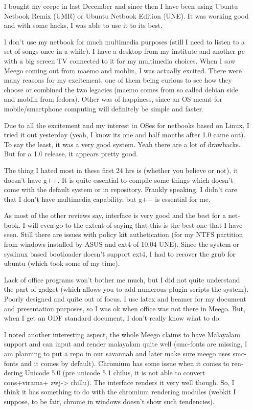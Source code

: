 \vskip 2pt
\begin{english}
I bought my eeepc in last December and since then I have been using Ubuntu Netbook Remix (UMR) or Ubuntu Netbook Edition (UNE). 
It was working good and with some hacks, I was able to use it to its best.

I don't use my netbook for much multimedia purposes (still I need to listen to a set of songs once in a while). 
I have a desktop from my institute and another pc with a big screen TV connected to it for my multimedia choices. 
When I saw Meego coming out from maemo and moblin, I was actually excited. There were many reasons for my excitement, 
one of them being curious to see how they choose or combined the two legacies (maemo comes from so called debian side and moblin from fedora).
Other was of happiness, since an OS meant for mobile/smartphone computing will definitely be simple and faster.

Due to all the excitement and my interest in OSes for netbooks based on Linux, I tried it out yesterday (yeah, I know its one and half months after 1.0 came out). To say the least, it was a very good system. 
Yeah there are a lot of drawbacks. But for a 1.0 release, it appears pretty good.

The thing I hated most in these first 24 hrs is (whether you believe or not), it doesn’t have g++. 
It is quite essential to compile some things which doesn’t come with the default system or in repository. 
Frankly speaking, I didn’t care that I don’t have multimedia capability, but g++ is essential for me.

As most of the other reviews say, interface is very good and the best for a netbook. I will even go to the extent of saying that this is the best one that I have seen. Still there are issues with policy kit authetication (for my NTFS partition from windows 
installed by ASUS and ext4 of 10.04 UNE). Since the system or syslinux based bootloader doesn’t support ext4, 
I had to recover the grub for ubuntu (which took some of my time).

Lack of office programs won't bother me much, but I did not quite understand the part of gadget (which allows you to add numerous 
plugin scripts the system). Poorly designed and quite out of focus. I use latex and beamer for my document and presentation 
purposes, so I was ok when office was not there in Meego. But, when I get an ODF standard document, 
I don’t really know what to do.

I noted another interesting aspect, the whole Meego claims to have Malayalam support and can input and render 
malayalam quite well (smc-fonts are missing, I am planning to put a repo in our savannah and later make sure 
meego uses smc-fonts and it comes by default). Chromium has some issue when it comes to rendering Unicode 
5.0 (pre unicode 5.1 chilus, it is not able to convert cons+virama+ zwj-> chillu). 
The interface renders it very well though. So, I think it has something to do with the chromium 
rendering modules (webkit I suppose, to be fair, chrome in windows doesn’t show such tendencies).


\end{english}
